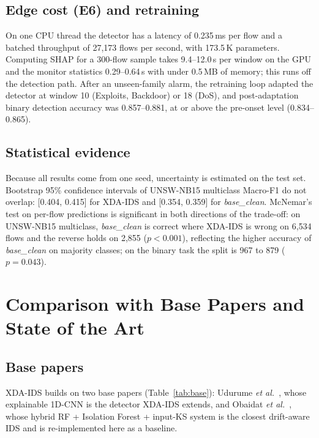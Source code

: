 \documentclass[conference]{IEEEtran}
\begin{document}
\subsection{Edge cost (E6) and retraining}
On one CPU thread the detector has a latency of 0.235\,ms per flow and a batched throughput of 27{,}173 flows per second, with 173.5\,K parameters. Computing SHAP for a 300-flow sample takes 9.4--12.0\,s per window on the GPU and the monitor statistics 0.29--0.64\,s with under 0.5\,MB of memory; this runs off the detection path. After an unseen-family alarm, the retraining loop adapted the detector at window 10 (Exploits, Backdoor) or 18 (DoS), and post-adaptation binary detection accuracy was 0.857--0.881, at or above the pre-onset level (0.834--0.865).

\subsection{Statistical evidence}
Because all results come from one seed, uncertainty is estimated on the test set. Bootstrap 95\% confidence intervals of UNSW-NB15 multiclass Macro-F1 do not overlap: [0.404, 0.415] for XDA-IDS and [0.354, 0.359] for \textit{base\_clean}. McNemar's test on per-flow predictions is significant in both directions of the trade-off: on UNSW-NB15 multiclass, \textit{base\_clean} is correct where XDA-IDS is wrong on 6{,}534 flows and the reverse holds on 2{,}855 ($p<0.001$), reflecting the higher accuracy of \textit{base\_clean} on majority classes; on the binary task the split is 967 to 879 ($p=0.043$).

\section{Comparison with Base Papers and State of the Art}\label{sec:base}
\subsection{Base papers}
XDA-IDS builds on two base papers (Table~\ref{tab:base}): Udurume \textit{et al.}~\cite{udurume2026}, whose explainable 1D-CNN is the detector XDA-IDS extends, and Obaidat \textit{et al.}~\cite{obaidat2026}, whose hybrid RF + Isolation Forest + input-KS system is the closest drift-aware IDS and is re-implemented here as a baseline.
\end{document}
